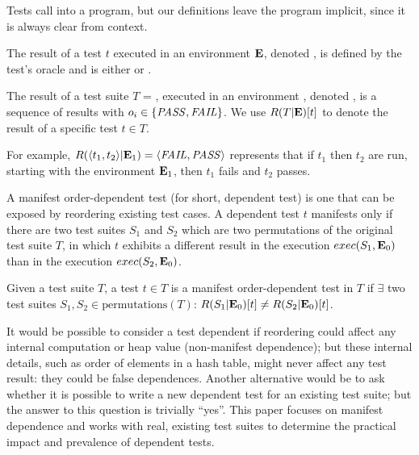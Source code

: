 Tests call into a program, but our definitions leave the program implicit,
since it is always clear from context.

\begin{definition}
The result of a test $t$ executed in an environment\/ $\mathbf{E}$,
denoted\/ , is defined by the test's oracle
and is either \pass or \fail.

The result of a test suite\/ $T$ = , executed in an
environment\/ \env, denoted\/ , is a
sequence of results\/  with $o_i \in \{\mathit{PASS},\mathit{FAIL}\}$.
We use $R(T|\mathbf{E})[t]$ to denote the result of a specific test $t \in T$.


For example, $R( \langle t_1, t_2 \rangle |\mathbf{E}_1) =  \langle \mathit{FAIL}, \mathit{PASS} \rangle $ represents that if
$t_1$ then $t_2$ are run, starting with the environment\/ $\mathbf{E}_1$, then\/
$t_1$ fails and\/ $t_2$ passes.
\end{definition}

A manifest order-dependent test (for short, dependent test)
is one that can be exposed by 
reordering existing test cases.
A dependent test $t$ manifests only
if there are two test suites $S_1$ and $S_2$ which
are two permutations of the original test suite $T$,
in which $t$ exhibits a different result
in the execution $exec(S_1,\mathbf{E}_0)$
than in the execution $exec(S_2,\mathbf{E}_0)$.

\begin{definition} \label{def:manifest}
Given a test suite\/ $T$, a test $t \in T$ is a
manifest order-de\-pen\-dent test in $T$ if $\exists$ two test suites
$S_1, S_2 \in \mbox{permutations}(T)$:
$R(S_1|\mathbf{E}_0)[t] \neq
R(S_2|\mathbf{E}_0)[t]$.
%
\end{definition}

It would be possible to consider a test dependent if reordering could
affect any internal computation or heap value (non-manifest dependence);
but these internal details, such as order of elements in a hash table,
might never affect any test result: they could be false dependences.
Another alternative would be to ask
whether it is possible to write a new dependent test for an existing
test suite; but the answer to this question is trivially ``yes''.
This paper focuses on manifest dependence and works with real, existing
test suites to determine the practical impact and prevalence of dependent
tests.


